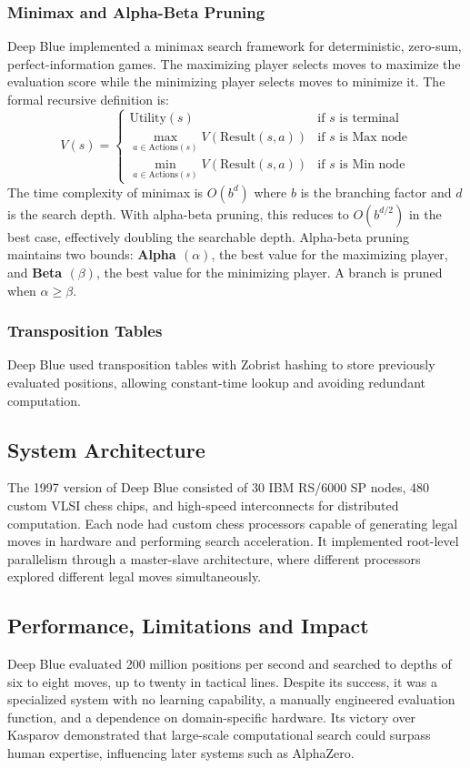 \documentclass[12pt,a4paper]{report}
\begin{document}
\subsubsection{Minimax and Alpha-Beta Pruning}
Deep Blue implemented a minimax search framework for deterministic, zero-sum, perfect-information games. The maximizing player selects moves to maximize the evaluation score while the minimizing player selects moves to minimize it. The formal recursive definition is:
\[
V(s) =
\begin{cases}
\text{Utility}(s) & \text{if } s \text{ is terminal} \\
\max\limits_{a \in \text{Actions}(s)} V(\text{Result}(s,a)) & \text{if } s \text{ is Max node} \\
\min\limits_{a \in \text{Actions}(s)} V(\text{Result}(s,a)) & \text{if } s \text{ is Min node}
\end{cases}
\]
The time complexity of minimax is $O(b^d)$ where $b$ is the branching factor and $d$ is the search depth.
With alpha-beta pruning, this reduces to $O(b^{d/2})$ in the best case, effectively doubling the searchable depth.
Alpha-beta pruning maintains two bounds: \textbf{Alpha $(\alpha)$}, the best value for the maximizing player, and \textbf{Beta $(\beta)$}, the best value for the minimizing player. A branch is pruned when $\alpha \ge \beta$.

\subsubsection{Transposition Tables}
Deep Blue used transposition tables with Zobrist hashing to store previously evaluated positions, allowing constant-time lookup and avoiding redundant computation.

\subsection{System Architecture}
The 1997 version of Deep Blue consisted of 30 IBM RS/6000 SP nodes, 480 custom VLSI chess chips, and high-speed interconnects for distributed computation. Each node had custom chess processors capable of generating legal moves in hardware and performing search acceleration. It implemented root-level parallelism through a master-slave architecture, where different processors explored different legal moves simultaneously.

\subsection{Performance, Limitations and Impact}
Deep Blue evaluated 200 million positions per second and searched to depths of six to eight moves, up to twenty in tactical lines. Despite its success, it was a specialized system with no learning capability, a manually engineered evaluation function, and a dependence on domain-specific hardware. Its victory over Kasparov demonstrated that large-scale computational search could surpass human expertise, influencing later systems such as AlphaZero.
\end{document}
